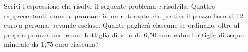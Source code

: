 \item Scrivi l'espressione che risolve il seguente problema e risolvila: Quattro rappresentanti vanno a pranzare in un ristorante che pratica il prezzo fisso di 12 euro a persona, bevande escluse. Quanto pagherà ciascuno se ordinano, oltre al proprio pranzo, anche una bottiglia di vino da 6,50 euro e due bottiglie di acqua minerale da 1,75 euro ciascuna?